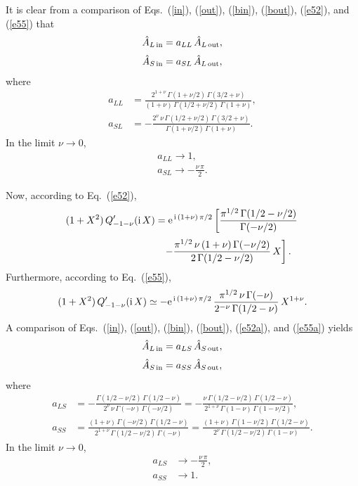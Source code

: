 \documentclass[12pt,prb,aps,notitlepage]{revtex4-1}
\begin{document}
It is clear from a comparison of Eqs.~(\ref{in}), (\ref{out}), (\ref{bin}), (\ref{bout}), (\ref{e52}), and (\ref{e55}) that
\begin{align}
\hat{A}_{L\,{\rm in}} &= a_{LL}\,\hat{A}_{L\,{\rm out}},\\[0.5ex]
\hat{A}_{S\,{\rm in}}&= a_{SL}\,\hat{A}_{L\,{\rm out}},
\end{align}
where
\begin{align}
a_{LL} &= \frac{2^{1+\nu}\,\Gamma(1+\nu/2)\,\Gamma(3/2+\nu)}{(1+\nu)\,\Gamma(1/2+\nu/2)\,\Gamma(1+\nu)},\\[0.5ex]
a_{SL}&=- \frac{2^\nu\,\nu\,\Gamma(1/2+\nu/2)\,\Gamma(3/2+\nu)}{\Gamma(1+\nu/2)\,\Gamma(1+\nu)}.
\end{align}
In the limit $\nu\rightarrow 0$,
\begin{align}
a_{LL}\rightarrow 1,\\[0.5ex]
a_{SL} \rightarrow - \frac{\nu\,\pi}{2}.
\end{align}

Now, according to Eq.~(\ref{e52}), 
\begin{align}\label{e52a}
(1+X^2)\,Q_{-1-\nu}'({\rm i}\,X)&= {\rm e}^{\,{\rm i}\,(1+\nu)\,\pi/2}\left[\frac{\pi^{1/2}\,\Gamma(1/2-\nu/2)}{\Gamma(-\nu/2)}\right.\nonumber\\[0.5ex]
&\phantom{=}\left.-
\frac{\pi^{1/2}\,\nu\,(1+\nu)\,\Gamma(-\nu/2)}{2\,\Gamma(1/2-\nu/2)}\,X\right].
\end{align}
Furthermore, according to Eq.~(\ref{e55}), 
\begin{align}\label{e55a}
(1+X^2)\,Q_{-1-\nu}'({\rm i}\,X) \simeq- {\rm e}^{\,{\rm i}\,(1+\nu)\,\pi/2}\,\frac{\pi^{1/2}\,\nu\,{\Gamma}(-\nu)}{2^{-\nu}\,\Gamma(1/2-\nu)}\,X^{1+\nu}.
\end{align}
A comparison of Eqs.~(\ref{in}), (\ref{out}), (\ref{bin}), (\ref{bout}), (\ref{e52a}), and (\ref{e55a}) yields
\begin{align}
\hat{A}_{L\,{\rm in}} &= a_{LS}\,\hat{A}_{S\,{\rm out}},\\[0.5ex]
\hat{A}_{S\,{\rm in}}&= a_{SS}\,\hat{A}_{S\,{\rm out}},
\end{align}
where
\begin{align}
a_{LS} &=- \frac{\Gamma(1/2-\nu/2)\,\Gamma(1/2-\nu)}{2^{\nu}\,\nu\,\Gamma(-\nu)\,\Gamma(-\nu/2)}= -\frac{\nu\,\Gamma(1/2-\nu/2)\,\Gamma(1/2-\nu)}{2^{1+\nu}\,\Gamma(1-\nu)\,\Gamma(1-\nu/2)},\\[0.5ex]
a_{SS}&= \frac{(1+\nu)\,\Gamma(-\nu/2)\,\Gamma(1/2-\nu)}{2^{1+\nu}\,\Gamma(1/2-\nu/2)\,\Gamma(-\nu)} = \frac{(1+\nu)\,\Gamma(1-\nu/2)\,\Gamma(1/2-\nu)}{2^\nu\,\Gamma(1/2-\nu/2)\,\Gamma(1-\nu)}.
\end{align}
In the limit $\nu\rightarrow 0$,
\begin{align}
a_{LS}&\rightarrow -\frac{\nu\,\pi}{2},\\[0.5ex]
a_{SS} &\rightarrow 1.
\end{align}
\end{document}
